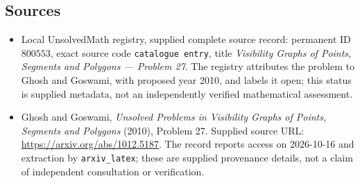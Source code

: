 \documentclass[11pt]{article}
\begin{document}
\subsection{Sources}
\begin{itemize}
\item Local UnsolvedMath registry, supplied complete source record: permanent ID \(800553\), exact source code \texttt{catalogue entry}, title \emph{Visibility Graphs of Points, Segments and Polygons --- Problem 27}. The registry attributes the problem to Ghosh and Goswami, with proposed year 2010, and labels it open; this status is supplied metadata, not an independently verified mathematical assessment.
\item Ghosh and Goswami, \emph{Unsolved Problems in Visibility Graphs of Points, Segments and Polygons} (2010), Problem 27. Supplied source URL: \url{https://arxiv.org/abs/1012.5187}. The record reports access on 2026-10-16 and extraction by \texttt{arxiv\_latex}; these are supplied provenance details, not a claim of independent consultation or verification.
\end{itemize}
\end{document}
